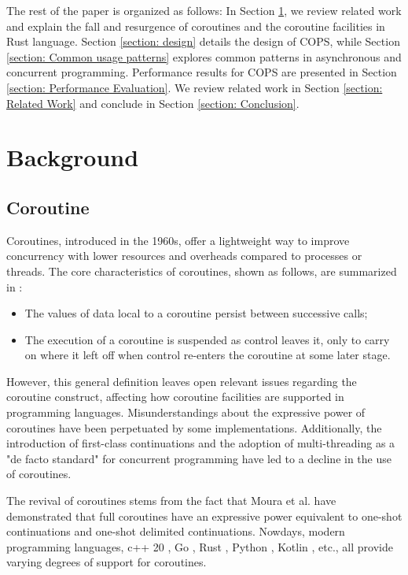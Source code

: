 \documentclass[conference]{IEEEtran}
\begin{document}
The rest of the paper is organized as follows: In Section \ref{section: Background}, we review related work and explain the fall and resurgence of coroutines and the coroutine facilities in Rust language. Section \ref{section: design} details the design of COPS, while Section \ref{section: Common usage patterns} explores common patterns in asynchronous and concurrent programming. Performance results for COPS are presented in Section \ref{section: Performance Evaluation}. We review related work in Section \ref{section: Related Work} and conclude in Section \ref{section: Conclusion}.

\section{Background}
\label{section: Background}

\subsection{Coroutine}

Coroutines, introduced in the 1960s, offer a lightweight way to improve concurrency with lower resources and overheads compared to processes or threads. The core characteristics of coroutines, shown as follows, are summarized in \cite{1980Coroutines}:

\begin{itemize}[leftmargin=*]
  \item[1)] The values of data local to a coroutine persist between successive calls;
  \item[2)] The execution of a coroutine is suspended as control leaves it, only to carry on where it left off when control re-enters the coroutine at some later stage.
\end{itemize}

However, this general definition leaves open relevant issues regarding the coroutine construct, affecting how coroutine facilities are supported in programming languages. Misunderstandings about the expressive power of coroutines have been perpetuated by some implementations. Additionally, the introduction of first-class continuations and the adoption of multi-threading as a "de facto standard" for concurrent programming have led to a decline in the use of coroutines.

The revival of coroutines stems from the fact that Moura et al. \cite{2009Revisiting} have demonstrated that full coroutines have an expressive power equivalent to one-shot continuations and one-shot delimited continuations. Nowdays, modern programming languages, c++ 20 \cite{C++20-coroutine}, Go \cite{goroutines}, Rust \cite{rosendahl2017green}, Python \cite{python-coroutine}, Kotlin \cite{kotlin-coroutines}, etc., all provide varying degrees of support for coroutines.
\end{document}
